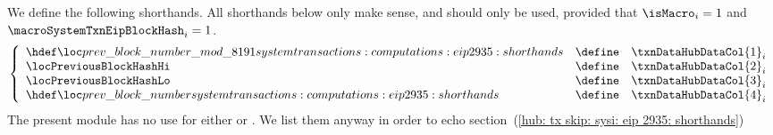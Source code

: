 We define the following shorthands.
All shorthands below only make sense, and should only be used, provided that
$\isMacro               _{i} = 1$ and
$\macroSystemTxnEipBlockHash _{i} = 1$.
\[
	\left\{ \begin{array}{lcl}
		\locPreviousBlockNumberModuloPrime & \define & \txnDataHubDataCol {1} _{i} \\
		\locPreviousBlockHashHi            & \define & \txnDataHubDataCol {2} _{i} \\
		\locPreviousBlockHashLo            & \define & \txnDataHubDataCol {3} _{i} \\
		\locPreviousBlockNumber            & \define & \txnDataHubDataCol {4} _{i} \\
	\end{array} \right.
\]
\saNote{}
The present module has no use for either
\locPreviousBlockHashHi{} or
\locPreviousBlockHashLo{}.
We list them anyway in order to echo
section~(\ref{hub: tx skip: sysi: eip 2935: shorthands})
